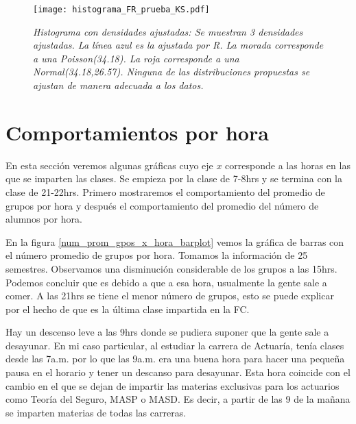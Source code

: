 \begin{figure}[H]
\centering
\texttt{[image: histograma\_FR\_prueba\_KS.pdf]} %
\caption[\textit{Histograma con densidades ajustadas}]{\textit{Histograma con densidades ajustadas: Se muestran 3 densidades ajustadas. La línea azul es la ajustada por R. La morada corresponde a una Poisson(34.18). La roja corresponde a una Normal(34.18,26.57). Ninguna de las distribuciones propuestas se ajustan de manera adecuada a los datos.}}\label{histFR_pruebaKS}
\end{figure}



\section{Comportamientos por hora}

En esta sección veremos algunas gráficas cuyo eje $x$ corresponde a las horas en las que se imparten las clases. Se empieza por la clase de 7-8hrs y se termina con la clase de 21-22hrs. Primero mostraremos el comportamiento del promedio de grupos por hora y después el comportamiento del promedio del número de alumnos por hora.

En la figura \ref{num_prom_gpos_x_hora_barplot} vemos la gráfica de barras con el número promedio de grupos por hora. Tomamos la información de 25 semestres. Observamos una disminución considerable de los grupos a las 15hrs. Podemos concluir que es debido a que a esa hora, usualmente la gente sale a comer. A las 21hrs se tiene el menor número de grupos, esto se puede explicar por el hecho de que es la última clase impartida en la FC.

Hay un descenso leve a las 9hrs donde se pudiera suponer que la gente sale a desayunar. En mi caso particular, al estudiar la carrera de Actuaría, tenía clases desde las 7a.m. por lo que las 9a.m. era una buena hora para hacer una pequeña pausa en el horario y tener un descanso para desayunar. Esta hora coincide con el cambio en el que se dejan de impartir las materias exclusivas para los actuarios como Teoría del Seguro, MASP o MASD. Es decir, a partir de las 9 de la mañana se imparten materias de todas las carreras.

